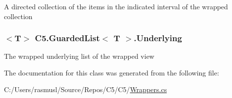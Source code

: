 A directed collection of the items in the indicated interval of the wrapped collection\hypertarget{class_c5_1_1_guarded_list_af6565bed0e461d28b7f125481d22cc5f}{}
\subsubsection[{Underlying}]{$<$T$>$ {\bf C5.\+Guarded\+List}$<$ T $>$.Underlying\hspace{0.3cm}{\ttfamily [get]}}\label{class_c5_1_1_guarded_list_af6565bed0e461d28b7f125481d22cc5f}




The wrapped underlying list of the wrapped view 

The documentation for this class was generated from the following file\+:\begin{DoxyCompactItemize}
\item 
C\+:/\+Users/rasmusl/\+Source/\+Repos/\+C5/\+C5/\hyperlink{_wrappers_8cs}{Wrappers.\+cs}\end{DoxyCompactItemize}
